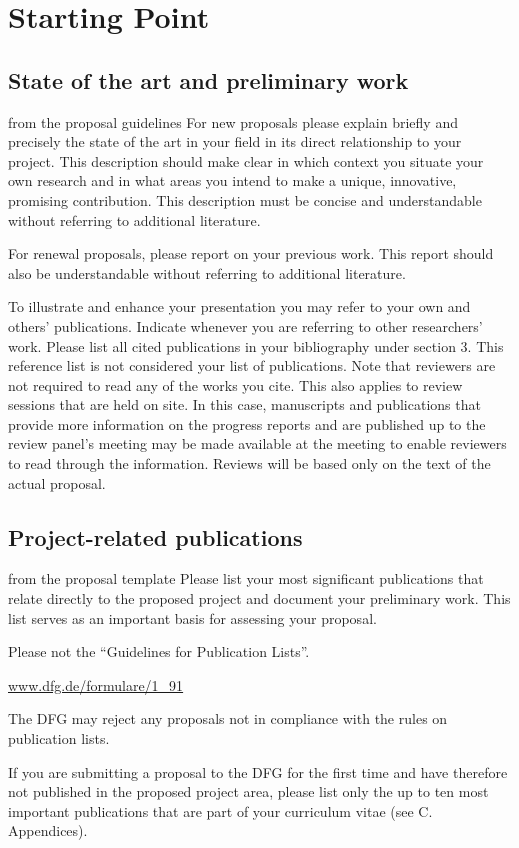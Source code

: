\section{Starting Point}

\subsection{State of the art and preliminary work}\label{sec:state}
\begin{todo}{from the proposal guidelines}
  For new proposals please explain briefly and precisely the state of the art in your
  field in its direct relationship to your project. This description should make clear in
  which context you situate your own research and in what areas you intend to make a
  unique, innovative, promising contribution. This description must be concise and
  understandable without referring to additional literature.

  For renewal proposals, please report on your previous work. This report should also be
  understandable without referring to additional literature.

  To illustrate and enhance your presentation you may refer to your own and others’
  publications. Indicate whenever you are referring to other researchers’ work.  Please
  list all cited publications in your bibliography under section 3. This reference list is
  not considered your list of publications. Note that reviewers are not required to read
  any of the works you cite. This also applies to review sessions that are held on
  site. In this case, manuscripts and publications that provide more information on the
  progress reports and are published up to the review panel’s meeting may be made
  available at the meeting to enable reviewers to read through the information. Reviews
  will be based only on the text of the actual proposal.
\end{todo}

\subsection{Project-related publications}\label{sec:projpapers}

\begin{todo}{from the proposal template}
  Please list your most significant publications that relate directly to the proposed project and document your preliminary work. This list serves as an important basis for assessing your proposal.
  
  Please not the ``Guidelines for Publication Lists''. 
  
  \url{www.dfg.de/formulare/1_91}
  
  The DFG may reject any proposals not in compliance with the rules on publication lists.
  
  If you are submitting a proposal to the DFG for the first time and have therefore not published in the proposed project area, please list only the up to ten most important publications that are part of your curriculum vitae (see C. Appendices).
\end{todo}

